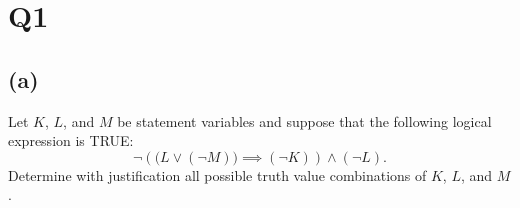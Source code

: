 \section{Q1}
\subsection{(a)}

\begin{problem}
    Let $K$, $L$, and $M$ be statement variables and suppose that the
    following logical expression is TRUE:
    \[
        \neg\left(
            \bigl(L \lor (\neg M)\bigr)
            \implies (\neg K)
        \right)
        \land (\neg L).
    \]
    Determine with justification all possible truth value combinations of
    $K$, $L$, and $M$.
\end{problem}

